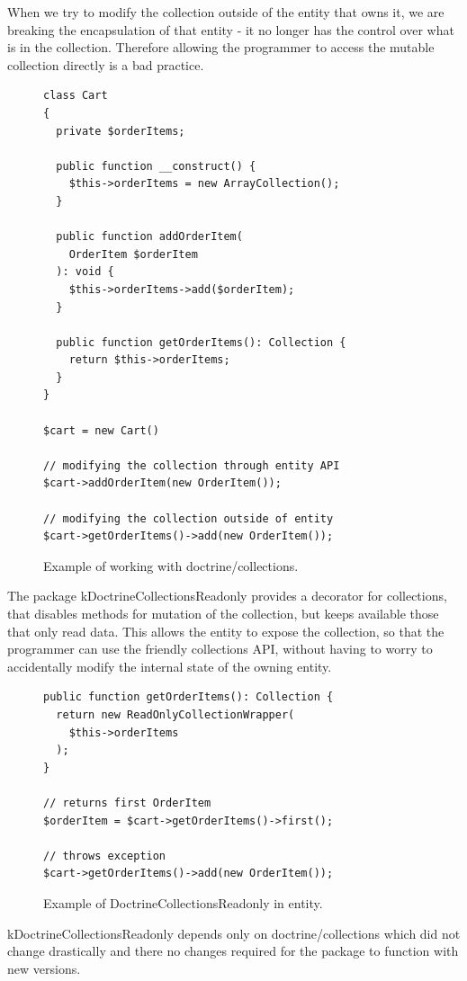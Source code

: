 When we try to modify the collection outside of the entity that owns it, we are breaking the encapsulation of that entity - it no longer has the control over what is in the collection. Therefore allowing the programmer to access the mutable collection directly is a bad practice.

\begin{figure} \label{fig:collections-readonly:example}
\begin{lstlisting}
class Cart
{
  private $orderItems;

  public function __construct() {
    $this->orderItems = new ArrayCollection();
  }

  public function addOrderItem(
    OrderItem $orderItem
  ): void {
    $this->orderItems->add($orderItem);
  }

  public function getOrderItems(): Collection {
    return $this->orderItems;
  }
}

$cart = new Cart()

// modifying the collection through entity API
$cart->addOrderItem(new OrderItem());

// modifying the collection outside of entity
$cart->getOrderItems()->add(new OrderItem());
\end{lstlisting}
\caption{Example of working with doctrine/collections.}
\end{figure}

The package \gls{kDoctrineCollectionsReadonly} provides a decorator for collections, that disables methods for mutation of the collection, but keeps available those that only read data. This allows the entity to expose the collection, so that the programmer can use the friendly collections API, without having to worry to accidentally modify the internal state of the owning entity.

\begin{figure} \label{fig:collections-readonly:readonly}
\begin{lstlisting}
public function getOrderItems(): Collection {
  return new ReadOnlyCollectionWrapper(
    $this->orderItems
  );
}

// returns first OrderItem
$orderItem = $cart->getOrderItems()->first();

// throws exception
$cart->getOrderItems()->add(new OrderItem());
\end{lstlisting}
\caption{Example of DoctrineCollectionsReadonly in entity.}
\end{figure}

\gls{kDoctrineCollectionsReadonly} depends only on doctrine/collections which did not change drastically and there no changes required for the package to function with new versions.

